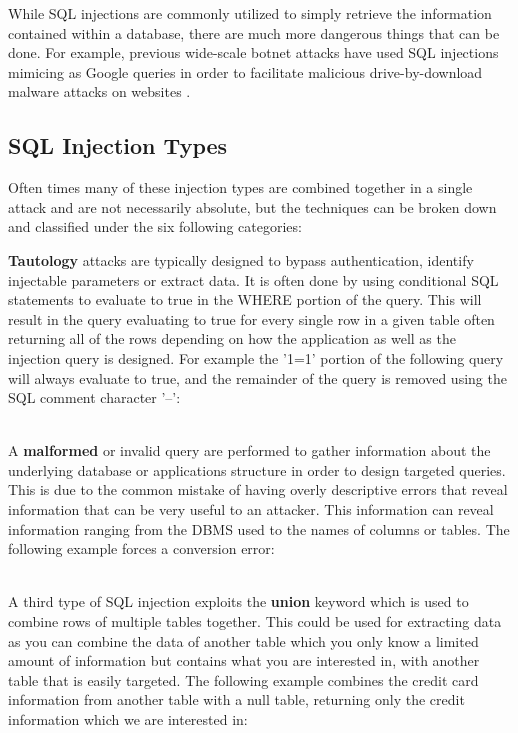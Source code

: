 While SQL injections are commonly utilized to simply retrieve the information contained within a database, there are much more dangerous things that can be done.  For example, previous wide-scale botnet attacks have used SQL injections mimicing as Google queries in order to facilitate malicious drive-by-download malware attacks on websites \cite{aSurveyOnWeb}.

\subsection{SQL Injection Types}\label{sec:sqliTypes}

Often times many of these injection types are combined together in a single attack and are not necessarily absolute, but the techniques can be broken down and classified under the six following categories:

\textbf{Tautology} attacks are typically designed to bypass authentication, identify injectable parameters or extract data.  It is often done by using conditional SQL statements to evaluate to true in the WHERE portion of the query.  This will result in the query evaluating to true for every single row in a given table often returning all of the rows depending on how the application as well as the injection query is designed. For example the '1=1' portion of the following query will always evaluate to true, and the remainder of the query is removed using the SQL comment character '--':

\noindent
{}
\\

A \textbf{malformed} or invalid query are performed to gather information about the underlying database or applications structure in order to design targeted queries.  This is due to the common mistake of having overly descriptive errors that reveal information that can be very useful to an attacker. This information can reveal information ranging from the DBMS used to the names of columns or tables.  The following example forces a conversion error:

\noindent
{}
\\

A third type of SQL injection exploits the \textbf{union} keyword which is used to combine rows of multiple tables together.  This could be used for extracting data as you can combine the data of another table which you only know a limited amount of information but contains what you are interested in, with another table that is easily targeted.  The following example combines the credit card information from another table with a null table, returning only the credit information which we are interested in:

